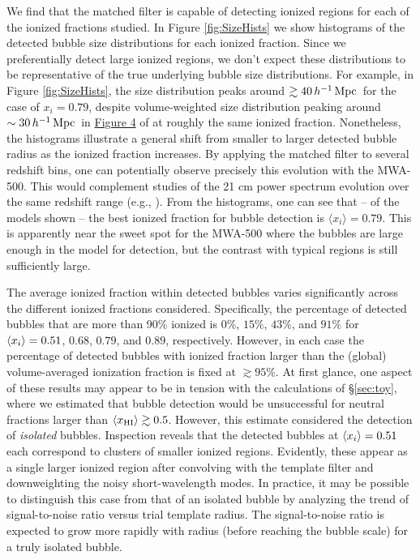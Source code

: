 We find that the matched filter is capable of detecting ionized
regions for each of the ionized fractions studied. In
Figure \ref{fig:SizeHists} we show histograms of the detected
bubble size distributions for each ionized fraction. Since
we preferentially detect large ionized regions, we don't
expect these distributions to be representative of the
true underlying bubble size distributions. For example, in Figure
\ref{fig:SizeHists}, the size distribution peaks around $\gtrsim40\,h^{-1}\,{\rm Mpc}\,$ for
the case of $x_i = 0.79$, despite volume-weighted size distribution peaking around $\sim 30\,h^{-1}\,{\rm Mpc}\,$ in
\href{http://iopscience.iop.org/0004-637X/654/1/12/fulltext/65071.fg4.html}{Figure
  4} of \cite{Zahn:2006sg} at roughly the same ionized fraction. Nonetheless,
the histograms illustrate a general shift from smaller to larger detected
bubble radius as the ionized fraction increases. By applying
the matched filter to several redshift bins, one can potentially
observe precisely this evolution with the MWA-500. This would
complement studies of the 21 cm power spectrum evolution over
the same redshift range (e.g., \citealt{Lidz:2007az}). From
the histograms, one can see that -- of the models shown -- the 
best ionized fraction
for bubble detection is $\langle x_i \rangle = 0.79$. This is apparently near the sweet spot for the MWA-500 where
the bubbles are large enough in the model for detection, but
the contrast with typical regions is still sufficiently large.

The average ionized fraction within detected bubbles varies
significantly across the different ionized fractions considered.
Specifically, the percentage of detected bubbles that are more than
90\% ionized is $0\%$, $15\%$, $43\%$, and $91\%$ for $\langle x_{i} \rangle = 0.51$,
$0.68$, $0.79$, and $0.89$, respectively.  However, in each case the
percentage of detected bubbles with ionized fraction larger than the
(global) volume-averaged ionization fraction is fixed at $\gtrsim 95\%$. At
first glance, one aspect of these results may appear to be in tension
with the calculations of \S\ref{sec:toy}, where we estimated that
bubble detection would be unsuccessful for neutral fractions larger
than $\langle x_{\rm HI}\rangle \gtrsim 0.5$.  However, this estimate
considered the detection of {\em isolated} bubbles. Inspection reveals
that the detected bubbles at $\langle x_{i} \rangle = 0.51$ each correspond to clusters
of smaller ionized regions. Evidently, these appear as a single larger ionized
region after convolving with the template filter and downweighting
the noisy short-wavelength modes. In practice, it may be possible to distinguish
this case from that of an isolated bubble by analyzing the trend of 
signal-to-noise ratio versus trial template radius. The signal-to-noise
ratio is expected to grow more rapidly with radius (before reaching the bubble
scale) for a truly isolated
bubble.


